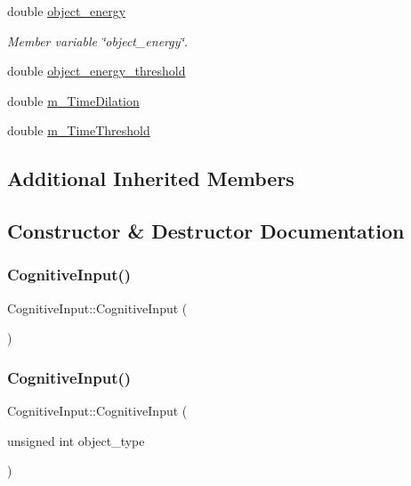 \begin{DoxyCompactItemize}
double \mbox{\hyperlink{classCognitiveInput_a56cb85463a47cdd57f5cf2869d0e0761}{object\+\_\+energy}}
\begin{DoxyCompactList}\small\item\em Member variable \char`\"{}object\+\_\+energy\char`\"{}. \end{DoxyCompactList}\item 
double \mbox{\hyperlink{classCognitiveInput_aea44f8591ccd7876a4f2ddf450244ea2}{object\+\_\+energy\+\_\+threshold}}
\item 
double \mbox{\hyperlink{classCognitiveInput_ad2726705c7242a842ad93272c6b7258a}{m\+\_\+\+Time\+Dilation}}
\item 
double \mbox{\hyperlink{classCognitiveInput_a11d157d16bfe28880973320cdaef33bc}{m\+\_\+\+Time\+Threshold}}
\end{DoxyCompactItemize}
\subsection*{Additional Inherited Members}


\subsection{Constructor \& Destructor Documentation}
\mbox{\label{classCognitiveInput_a5c3c102dc3ec6cfec25eb849488e9782}} 
\subsubsection{\texorpdfstring{Cognitive\+Input()}{CognitiveInput()}\hspace{0.1cm}{\footnotesize\ttfamily [1/4]}}
{\footnotesize\ttfamily Cognitive\+Input\+::\+Cognitive\+Input (\begin{DoxyParamCaption}{ }\end{DoxyParamCaption})\hspace{0.3cm}{\ttfamily [inline]}}

\mbox{\label{classCognitiveInput_a220c07f5be517afe47b4d3c486c4152e}} 
\subsubsection{\texorpdfstring{Cognitive\+Input()}{CognitiveInput()}\hspace{0.1cm}{\footnotesize\ttfamily [2/4]}}
{\footnotesize\ttfamily Cognitive\+Input\+::\+Cognitive\+Input (\begin{DoxyParamCaption}\item[{unsigned int}]{object\+\_\+type }\end{DoxyParamCaption})\hspace{0.3cm}{\ttfamily [inline]}}

